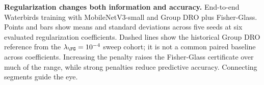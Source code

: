 \textbf{Regularization changes both information and accuracy.}
End-to-end Waterbirds training with MobileNetV3-small and Group DRO plus Fisher-Glass. Points and bars show means and standard deviations across five seeds at six evaluated regularization coefficients. Dashed lines show the historical Group DRO reference from the $\lambda_{\FG}=10^{-4}$ sweep cohort; it is not a common paired baseline across coefficients. Increasing the penalty raises the Fisher-Glass certificate over much of the range, while strong penalties reduce predictive accuracy. Connecting segments guide the eye.
